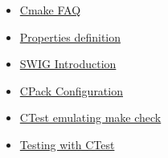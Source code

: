 \documentclass[a4paper,11pt]{report}
\begin{document}
\begin{itemize}
\item \href{http://www.cmake.org/Wiki/CMake_FAQ}{Cmake FAQ}
\item \href{http://www.cmake.org/cmake/help/v3.0/command/set_target_properties.html}{Properties definition}
\item \href{http://www.swig.org/Doc1.3/Introduction.html}{SWIG Introduction}
\item
  \href{http://www.cmake.org/Wiki/CMake\%3aCPackConfiguration}{CPack
    Configuration}
\item \href{http://www.vtk.org/Wiki/CMakeEmulateMakeCheck}{CTest
  emulating make check}
\item \href{https://cmake.org/Wiki/CMake/Testing_With_CTest}{Testing
  with CTest}
\end{itemize}

{\small
{
  }}
\end{document}
